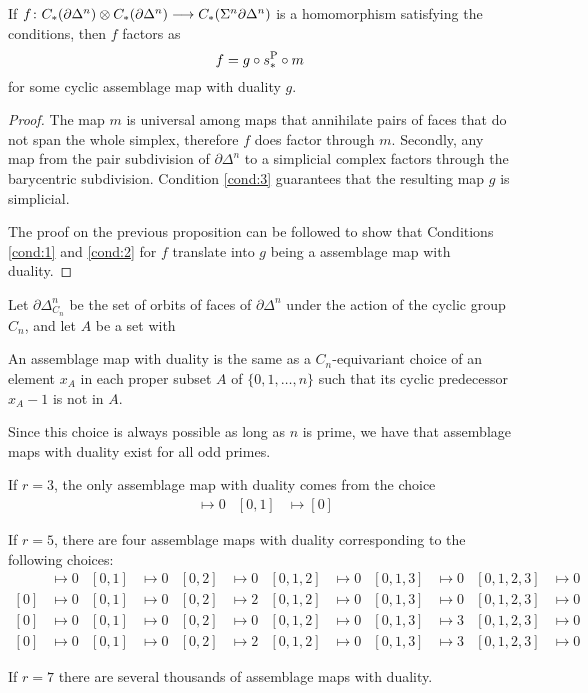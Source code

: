 \begin{proposition} If $f\colon C_*(\partial \Delta^n)\otimes C_*(\partial \Delta^n)\longrightarrow C_*(\Sigma^n\partial \Delta^n)$ is a homomorphism satisfying the conditions, then $f$ factors as
\[f = g\circ s_*^{\operatorname{P}}\circ m\]
for some cyclic assemblage map with duality $g$.
\end{proposition}
\begin{proof}
The map $m$ is universal among maps that annihilate pairs of faces that do not span the whole simplex, therefore $f$ does factor through $m$. Secondly, any map from the pair subdivision of $\partial \Delta^n$ to a simplicial complex factors through the barycentric subdivision. Condition \eqref{cond:3} guarantees that the resulting map $g$ is simplicial.

The proof on the previous proposition can be followed to show that Conditions \eqref{cond:1} and \eqref{cond:2} for $f$ translate into $g$ being a assemblage map with duality.
\end{proof}

Let $\partial \Delta^n_{C_n}$ be the set of orbits of faces of $\partial \Delta^n$ under the action of the cyclic group $C_n$, and let $A$ be a set with


\begin{lemma} An assemblage map with duality is the same as a  $C_n$-equivariant choice of an element $x_A$ in each proper subset $A$ of $\{0,1,\ldots,n\}$ such that its cyclic predecessor $x_A-1$ is not in $A$.
\end{lemma}
Since this choice is always possible as long as $n$ is prime, we have that assemblage maps with duality exist for all odd primes.
\begin{example}
    If $r=3$, the only assemblage map with duality comes from the choice
    \begin{align*}
        [0]&\mapsto 0 & [0,1]&\mapsto [0]
    \end{align*}
\end{example}
\begin{example}
    If $r=5$, there are four assemblage maps with duality corresponding to the following choices:
    \begin{align*}
        [0]&\mapsto 0 & [0,1]&\mapsto 0 & [0,2]&\mapsto 0 & [0,1,2]&\mapsto 0 & [0,1,3] & \mapsto 0 & [0,1,2,3] & \mapsto 0 \\
        [0]&\mapsto 0 & [0,1]&\mapsto 0 & [0,2]&\mapsto 2 & [0,1,2]&\mapsto 0 & [0,1,3] & \mapsto 0 & [0,1,2,3] & \mapsto 0 \\
        [0]&\mapsto 0 & [0,1]&\mapsto 0 & [0,2]&\mapsto 0 & [0,1,2]&\mapsto 0 & [0,1,3] & \mapsto 3 & [0,1,2,3] & \mapsto 0 \\
        [0]&\mapsto 0 & [0,1]&\mapsto 0 & [0,2]&\mapsto 2 & [0,1,2]&\mapsto 0 & [0,1,3] & \mapsto 3 & [0,1,2,3] & \mapsto 0
    \end{align*}
\end{example}
If $r=7$ there are several thousands of assemblage maps with duality.



